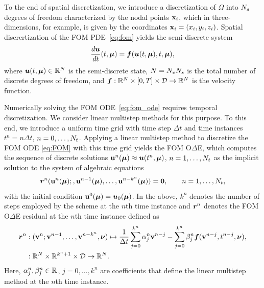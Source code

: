 \documentclass[3p,computermodern,10pt]{elsarticle}
\begin{document}
To the end of spatial discretization, we introduce a discretization of $\Omega$ into $N_s$ degrees of freedom characterized by the nodal points $\mathbf{x}_i$, which in three-dimensions, for example, is given by the coordinates $\mathbf{x}_i = (x_i,y_i,z_i)$. Spatial discrertization of the FOM PDE~\eqref{eq:fom} yields the semi-discrete system  
\begin{equation}\label{eq:fom_ode}
\frac{d \boldsymbol u}{dt}(t,\boldsymbol \mu) = \boldsymbol f(\boldsymbol u(t,\boldsymbol \mu),t,\boldsymbol \mu),
\end{equation}
where $\boldsymbol u(t,\boldsymbol \mu) \in \mathbb{R}^{N}$ is the semi-discrete state, $N = N_v N_s$ is the total number of discrete degrees of freedom, and $\boldsymbol f: \mathbb{R}^{N} \times [0,T] \times \mathcal{D} \rightarrow \mathbb{R}^{N}$ is the velocity function.

Numerically solving the FOM ODE~\eqref{eq:fom_ode} requires temporal discretization. We consider linear multistep methods for this purpose. 
To this end, we introduce a uniform time
grid with time step $\Delta t$ and time instances
$t^n = n\Delta
t$, $n=0,\ldots,N_t$. 
Applying a linear multistep method to discretize the FOM ODE \eqref{eq:FOM}
with this time grid
yields the FOM O$\Delta$E, which computes the sequence of discrete
solutions
$\mathbf{u}^n(\boldsymbol \mu) \approx \boldsymbol u(t^n,\boldsymbol \mu)$, $n=1,\ldots,N_t$
as the implicit solution to the system of algebraic equations
\begin{equation}\label{eq:lms}
\boldsymbol{r}^n
	(\mathbf{u}^n(\boldsymbol \mu);,\mathbf{u}^{n-1}(\boldsymbol \mu),\ldots,\mathbf{u}^{n-k^n}(\boldsymbol \mu))
	= \boldsymbol 0,\qquad n=1,\ldots,N_t,
\end{equation}
with the initial condition $\mathbf{u}^0(\boldsymbol \mu) =\boldsymbol u_0(\boldsymbol \mu)$. In the above, $k^n$ denotes the number of steps employed by the scheme at the $n$th
time instance and 
$\boldsymbol{r}^n$ denotes the FOM O$\Delta$E residual at the $n$th time instance defined as
\begin{align*}
\boldsymbol{r}^n &: (\mathbf{v}^n;\mathbf{v}^{n-1},\ldots,\mathbf{v}^{n-k^n},\boldsymbol \nu) \mapsto  \frac{1}{\Delta t} \sum_{j=0}^{k^n} \alpha^n_j \mathbf{v}^{n-j} -  \sum_{j=0}^{k^n} \beta^n_j \boldsymbol f(\mathbf{v}^{n-j},t^{n-j},\boldsymbol \nu),
\\
&: \mathbb{R}^{N} \times \mathbb{R}^{k^n + 1} \times \mathcal{D} \rightarrow \mathbb{R}^{N}.
\end{align*} 
Here, $\alpha^n_j,\beta^n_j\in\mathbb{R}^{}$, $j=0,\ldots,k^n$ are coefficients
that define the linear multistep method at the $n$th time instance.
\end{document}
